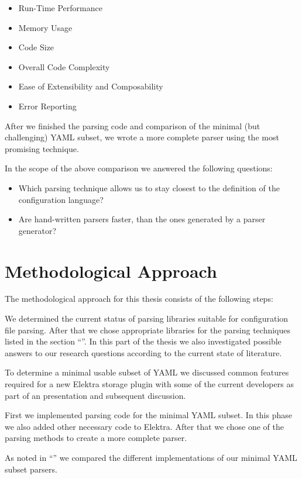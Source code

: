 \begin{itemize}
  \item Run-Time Performance
  \item Memory Usage
  \item Code Size
  \item Overall Code Complexity
  \item Ease of Extensibility and Composability
  \item Error Reporting
\end{itemize}

After we finished the parsing code and comparison of the minimal (but challenging) YAML subset, we wrote a more complete  parser using the most promising technique.

In the scope of the above comparison we answered the following questions:

\begin{itemize}[label=❓]

  \item Which parsing technique allows us to stay closest to the definition of the configuration language?

  \item Are hand-written parsers faster, than the ones generated by a parser generator?

\end{itemize}

\section{Methodological Approach}

The methodological approach for this thesis consists of the following steps:

\begin{description}[style=multiline, leftmargin=3.4cm, font=\bfseries]

  \item[Literature Review] We determined the current status of parsing libraries suitable for configuration file parsing. After that we chose appropriate libraries for the parsing techniques listed in the section “”. In this part of the thesis we also investigated possible answers to our research questions according to the current state of literature.

  \item[YAML Subset] To determine a minimal usable subset of YAML we discussed common features required for a new Elektra storage plugin with some of the current developers as part of an presentation and subsequent discussion.

  \item[Implementation] First we implemented parsing code for the minimal YAML subset. In this phase we also added other necessary code to Elektra. After that we chose one of the parsing methods to create a more complete  parser.

  \item[Comparison] As noted in “” we compared the different implementations of our minimal YAML subset parsers.

\end{description}
